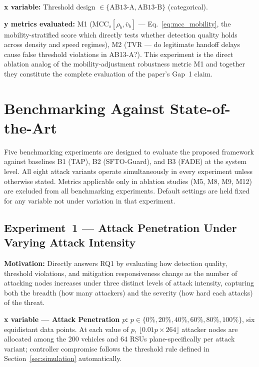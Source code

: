 \documentclass[12pt, a4paper]{report}
\begin{document}
{{\textbf{x variable:} Threshold design
$\in \{\text{AB13-A}, \text{AB13-B}\}$ (categorical).

\textbf{y metrics evaluated:} M1
($\text{MCC}_s[\rho_b, \bar{v}_b]$ —
Eq.~\ref{eq:mcc_mobility}, the mobility-stratified
score which directly tests whether detection quality
holds across density and speed regimes), M2 (TVR —
do legitimate handoff delays cause false threshold
violations in AB13-A?). This experiment is the
direct ablation analog of the mobility-adjustment
robustness metric M1 and together they constitute
the complete evaluation of the paper's Gap~1 claim.

\section{Benchmarking Against State-of-the-Art}
\label{sec:benchmarking}

Five benchmarking experiments are designed to evaluate
the proposed framework against baselines B1 (TAP),
B2 (SFTO-Guard), and B3 (FADE) at the system level.
All eight attack variants operate simultaneously in
every experiment unless otherwise stated. Metrics
applicable only in ablation studies (M5, M8, M9, M12)
are excluded from all benchmarking experiments.
Default settings are held fixed for any variable not
under variation in that experiment.


\subsection{Experiment~1 — Attack Penetration Under
Varying Attack Intensity}
\label{sec:exp1}

\textbf{Motivation:} Directly answers RQ1 by evaluating
how detection quality, threshold violations, and
mitigation responsiveness change as the number of
attacking nodes increases under three distinct levels
of attack intensity, capturing both the breadth
(how many attackers) and the severity (how hard each
attacks) of the threat.

\textbf{x variable — Attack Penetration $p$:}
$p \in \{0\%, 20\%, 40\%, 60\%, 80\%, 100\%\}$,
six equidistant data points. At each value of $p$,
$\lfloor 0.01p \times 264 \rfloor$ attacker nodes are
allocated among the 200 vehicles and 64 \ac{RSU}s
plane-specifically per attack variant; controller
compromise follows the threshold rule defined in
Section~\ref{sec:simulation} automatically.

}}
\end{document}
